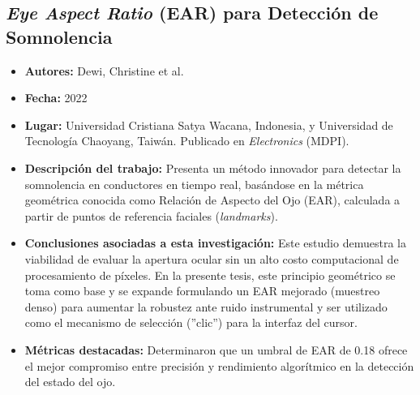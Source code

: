 \subsection{\textit{Eye Aspect Ratio} (EAR) para Detección de Somnolencia}
\begin{itemize}
	\item \textbf{Autores:} Dewi, Christine et al. \cite{dewi2022eye}
	\item \textbf{Fecha:} 2022
	\item \textbf{Lugar:} Universidad Cristiana Satya Wacana, Indonesia, y Universidad de Tecnología Chaoyang, Taiwán. Publicado en \textit{Electronics} (MDPI).
	\item \textbf{Descripción del trabajo:} Presenta un método innovador para detectar la somnolencia en conductores en tiempo real, basándose en la métrica geométrica conocida como Relación de Aspecto del Ojo (EAR), calculada a partir de puntos de referencia faciales (\textit{landmarks}).
	\item \textbf{Conclusiones asociadas a esta investigación:} Este estudio demuestra la viabilidad de evaluar la apertura ocular sin un alto costo computacional de procesamiento de píxeles. En la presente tesis, este principio geométrico se toma como base y se expande formulando un EAR mejorado (muestreo denso) para aumentar la robustez ante ruido instrumental y ser utilizado como el mecanismo de selección (''clic'') para la interfaz del cursor.
	\item \textbf{Métricas destacadas:} Determinaron que un umbral de EAR de 0.18 ofrece el mejor compromiso entre precisión y rendimiento algorítmico en la detección del estado del ojo.
\end{itemize}

